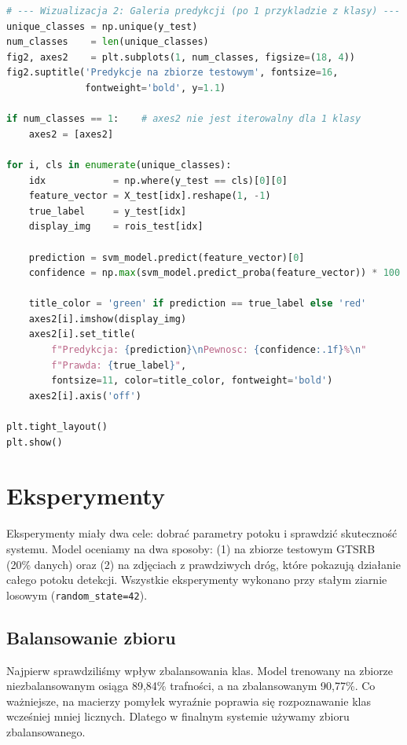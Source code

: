 \documentclass[12pt,oneside]{article}
\begin{document}
\begin{lstlisting}[language=Python,
    caption={Pełny potok treningu: preprocessing HSV + ekstrakcja HOG + SVM},
    label={lst:train}]
# --- Wizualizacja 2: Galeria predykcji (po 1 przykladzie z klasy) ---
unique_classes = np.unique(y_test)
num_classes    = len(unique_classes)
fig2, axes2    = plt.subplots(1, num_classes, figsize=(18, 4))
fig2.suptitle('Predykcje na zbiorze testowym', fontsize=16,
              fontweight='bold', y=1.1)

if num_classes == 1:    # axes2 nie jest iterowalny dla 1 klasy
    axes2 = [axes2]

for i, cls in enumerate(unique_classes):
    idx            = np.where(y_test == cls)[0][0]
    feature_vector = X_test[idx].reshape(1, -1)
    true_label     = y_test[idx]
    display_img    = rois_test[idx]

    prediction = svm_model.predict(feature_vector)[0]
    confidence = np.max(svm_model.predict_proba(feature_vector)) * 100

    title_color = 'green' if prediction == true_label else 'red'
    axes2[i].imshow(display_img)
    axes2[i].set_title(
        f"Predykcja: {prediction}\nPewnosc: {confidence:.1f}%\n"
        f"Prawda: {true_label}",
        fontsize=11, color=title_color, fontweight='bold')
    axes2[i].axis('off')

plt.tight_layout()
plt.show()
\end{lstlisting}

\section{Eksperymenty}
\label{sec:exp}
Eksperymenty miały dwa cele: dobrać parametry potoku i sprawdzić skuteczność
systemu. Model oceniamy na dwa sposoby: (1) na zbiorze testowym GTSRB (20\% danych)
oraz (2) na zdjęciach z prawdziwych dróg, które pokazują działanie całego potoku
detekcji. Wszystkie eksperymenty wykonano przy stałym ziarnie losowym
(\texttt{random\_state=42}).

\subsection{Balansowanie zbioru}
Najpierw sprawdziliśmy wpływ zbalansowania klas. Model trenowany na zbiorze
niezbalansowanym osiąga 89,84\% trafności, a na zbalansowanym 90,77\%. Co
ważniejsze, na macierzy pomyłek wyraźnie poprawia się rozpoznawanie klas wcześniej
mniej licznych. Dlatego w finalnym systemie używamy zbioru zbalansowanego.
\end{document}

